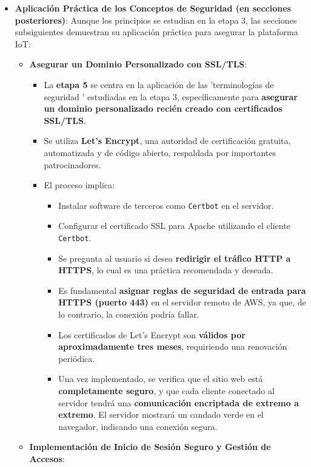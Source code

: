 \documentclass{report}
\begin{document}
\begin{itemize}
    \item \textbf{Aplicación Práctica de los Conceptos de Seguridad (en secciones posteriores)}: Aunque los principios se estudian en la etapa 3, las 
    secciones subsiguientes demuestran su aplicación práctica para asegurar la plataforma IoT:
    \begin{itemize}
        \item \textbf{Asegurar un Dominio Personalizado con SSL/TLS}:
        \begin{itemize}
            \item La \textbf{etapa 5} se centra en la aplicación de las  'terminologías de seguridad ' estudiadas en la etapa 3, específicamente para 
            \textbf{asegurar un dominio personalizado recién creado con certificados SSL/TLS}.
            \item Se utiliza \textbf{Let's Encrypt}, una autoridad de certificación gratuita, automatizada y de código abierto, respaldada por importantes 
            patrocinadores.
            \item El proceso implica:
            \begin{itemize}
                \item Instalar software de terceros como \texttt{Certbot} en el servidor.
                \item Configurar el certificado SSL para Apache utilizando el cliente \texttt{Certbot}.
                \item Se pregunta al usuario si desea \textbf{redirigir el tráfico HTTP a HTTPS}, lo cual es una práctica recomendada y deseada.
                \item Es fundamental \textbf{asignar reglas de seguridad de entrada para HTTPS (puerto 443)} en el servidor remoto de AWS, ya que, de lo 
                contrario, la conexión podría fallar.
                \item Los certificados de Let's Encrypt son \textbf{válidos por aproximadamente tres meses}, requiriendo una renovación periódica.
                \item Una vez implementado, se verifica que el sitio web está \textbf{completamente seguro}, y que cada cliente conectado al servidor 
                tendrá una \textbf{comunicación encriptada de extremo a extremo}. El servidor mostrará un candado verde en el navegador, indicando una 
                conexión segura.
            \end{itemize}
        \end{itemize}
        \item \textbf{Implementación de Inicio de Sesión Seguro y Gestión de Accesos}:

\end{itemize}
\end{itemize}
\end{document}
